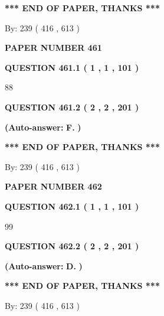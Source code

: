 \documentclass{ctexart}
\begin{document}
 
   
   
   
   
\vspace{1.0in} 
{\textbf{\large{ *** END OF PAPER, THANKS *** }}} 
   
   
\hspace{1.0in} By: 
 239 ( 416 ,  613 )
   
   
   
   
\newpage 
\setcounter{page}{ 
   461001 } 
   
   
 {\textbf{ \Large{ PAPER NUMBER  461  }}}
   
   
   
   
  
  
{\textbf{\large{QUESTION
461.1 
 ( 1 , 1 , 101 )
}}}

88
  
  
{\textbf{\large{QUESTION
461.2 
 ( 2 , 2 , 201 )
}}}
 
 
{\textbf{(Auto-answer:}}
{\textbf{\large{
F.}}}
{\textbf{)}}
 
 
   
   
   
   
\vspace{1.0in} 
{\textbf{\large{ *** END OF PAPER, THANKS *** }}} 
   
   
\hspace{1.0in} By: 
 239 ( 416 ,  613 )
   
   
   
   
\newpage 
\setcounter{page}{ 
   462001 } 
   
   
 {\textbf{ \Large{ PAPER NUMBER  462  }}}
   
   
   
   
  
  
{\textbf{\large{QUESTION
462.1 
 ( 1 , 1 , 101 )
}}}

99
  
  
{\textbf{\large{QUESTION
462.2 
 ( 2 , 2 , 201 )
}}}
 
 
{\textbf{(Auto-answer:}}
{\textbf{\large{
D.}}}
{\textbf{)}}
 
 
   
   
   
   
\vspace{1.0in} 
{\textbf{\large{ *** END OF PAPER, THANKS *** }}} 
   
   
\hspace{1.0in} By: 
 239 ( 416 ,  613 )
   
   
   
   
\newpage 
\setcounter{page}{ 
   463001 } 
   
\end{document}
